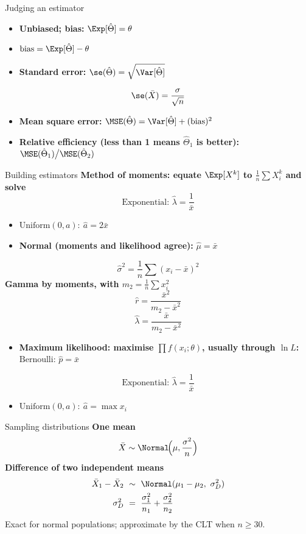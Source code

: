 \begin{formulabox}{Judging an estimator}
\begin{itemize}
  \item \textbf{Unbiased; bias:} $\Exp[\hat\Theta]=\theta$
  \item $\text{bias}=\Exp[\hat\Theta]-\theta$
  \item \textbf{Standard error:} $\se(\hat\Theta)=\sqrt{\Var[\hat\Theta]}$
\end{itemize}
\[ \se(\bar{X})=\frac{\sigma}{\sqrt n} \]
\begin{itemize}
  \item \textbf{Mean square error:} $\MSE(\hat\Theta)=\Var[\hat\Theta]+(\text{bias})^2$
  \item \textbf{Relative efficiency (less than 1 means $\hat\Theta_1$ is better):} $\MSE(\hat\Theta_1)\big/\MSE(\hat\Theta_2)$
\end{itemize}
\end{formulabox}

\begin{formulabox}{Building estimators}
\textbf{Method of moments: equate $\Exp[X^k]$ to $\frac1n\sum X_i^k$ and solve}
\[ \text{Exponential: }\hat\lambda=\frac1{\bar{x}} \]
\begin{itemize}
  \item $\text{Uniform}(0,a):\ \hat{a}=2\bar{x}$
  \item \textbf{Normal (moments and likelihood agree):} $\hat\mu=\bar{x}$
\end{itemize}
\[ \hat\sigma^2=\frac1n\sum(x_i-\bar{x})^2 \]
\textbf{Gamma by moments, with $m_2=\frac1n\sum x_i^2$}
\[ \hat{r}=\frac{\bar{x}^2}{m_2-\bar{x}^2} \]
\[ \hat\lambda=\frac{\bar{x}}{m_2-\bar{x}^2} \]
\begin{itemize}
  \item \textbf{Maximum likelihood: maximise $\prod f(x_i;\theta)$, usually through $\ln L$:} $\text{Bernoulli: }\hat{p}=\bar{x}$
\end{itemize}
\[ \text{Exponential: }\hat\lambda=\frac1{\bar{x}} \]
\begin{itemize}
  \item $\text{Uniform}(0,a):\ \hat{a}=\max x_i$
\end{itemize}
\end{formulabox}

\begin{formulabox}{Sampling distributions}
\textbf{One mean}
\[ \bar{X}\sim\Normal\!\Big(\mu,\frac{\sigma^2}{n}\Big) \]
\textbf{Difference of two independent means}
\[ \begin{aligned}\bar{X}_1-\bar{X}_2\ &\sim\ \Normal(\mu_1-\mu_2,\ \sigma_D^2)\\ \sigma_D^2\ &=\ \frac{\sigma_1^2}{n_1}+\frac{\sigma_2^2}{n_2}\end{aligned} \]
Exact for normal populations; approximate by the CLT when $n\ge30$.
\end{formulabox}

